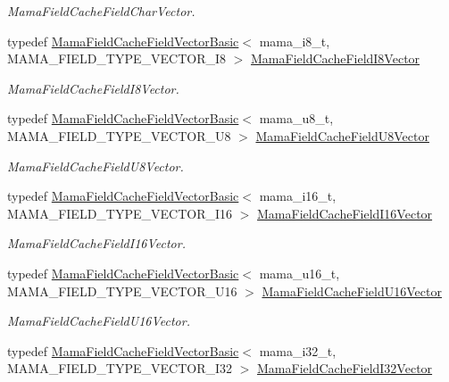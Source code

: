 \begin{DoxyCompactItemize}
\begin{DoxyCompactList}\small\item\em MamaFieldCacheFieldCharVector. \item\end{DoxyCompactList}\item 
typedef \hyperlink{classWombat_1_1MamaFieldCacheFieldVectorBasic}{MamaFieldCacheFieldVectorBasic}$<$ mama\_\-i8\_\-t, MAMA\_\-FIELD\_\-TYPE\_\-VECTOR\_\-I8 $>$ \hyperlink{namespaceWombat_a90369796fdd134be8cd2bef4b6cc25aa}{MamaFieldCacheFieldI8Vector}
\begin{DoxyCompactList}\small\item\em MamaFieldCacheFieldI8Vector. \item\end{DoxyCompactList}\item 
typedef \hyperlink{classWombat_1_1MamaFieldCacheFieldVectorBasic}{MamaFieldCacheFieldVectorBasic}$<$ mama\_\-u8\_\-t, MAMA\_\-FIELD\_\-TYPE\_\-VECTOR\_\-U8 $>$ \hyperlink{namespaceWombat_af16fbc3a5d95968ee15ad355b9962fdb}{MamaFieldCacheFieldU8Vector}
\begin{DoxyCompactList}\small\item\em MamaFieldCacheFieldU8Vector. \item\end{DoxyCompactList}\item 
typedef \hyperlink{classWombat_1_1MamaFieldCacheFieldVectorBasic}{MamaFieldCacheFieldVectorBasic}$<$ mama\_\-i16\_\-t, MAMA\_\-FIELD\_\-TYPE\_\-VECTOR\_\-I16 $>$ \hyperlink{namespaceWombat_af19965fac1b762df2701025c2e5a671c}{MamaFieldCacheFieldI16Vector}
\begin{DoxyCompactList}\small\item\em MamaFieldCacheFieldI16Vector. \item\end{DoxyCompactList}\item 
typedef \hyperlink{classWombat_1_1MamaFieldCacheFieldVectorBasic}{MamaFieldCacheFieldVectorBasic}$<$ mama\_\-u16\_\-t, MAMA\_\-FIELD\_\-TYPE\_\-VECTOR\_\-U16 $>$ \hyperlink{namespaceWombat_aae47a581fefae219a6e29c98497ba93f}{MamaFieldCacheFieldU16Vector}
\begin{DoxyCompactList}\small\item\em MamaFieldCacheFieldU16Vector. \item\end{DoxyCompactList}\item 
typedef \hyperlink{classWombat_1_1MamaFieldCacheFieldVectorBasic}{MamaFieldCacheFieldVectorBasic}$<$ mama\_\-i32\_\-t, MAMA\_\-FIELD\_\-TYPE\_\-VECTOR\_\-I32 $>$ \hyperlink{namespaceWombat_a0b59c4c34e4db14cf46469f100419f08}{MamaFieldCacheFieldI32Vector}

\end{DoxyCompactItemize}
